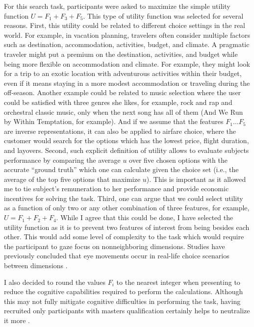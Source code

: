 \documentclass[a4paper,12pt]{article}
\begin{document}
For this search task, participants were asked to maximize the simple utility function $U = F_1 + F_3 + F_5$. This type of utility function was selected for several reasons. First, this utility could be related to different choice settings in the real world. For example, in vacation planning, travelers often consider multiple factors such as destination, accommodation, activities, budget, and climate. A pragmatic traveler might put a premium on the destination, activities, and budget while being more flexible on accommodation and climate. For example, they might look for a trip to an exotic location with adventurous activities within their budget, even if it means staying in a more modest accommodation or traveling during the off-season. Another example could be related to music selection where the user could be satisfied with three genres she likes, for example, rock and rap and orchestral classic music, only when the next song has all of them (And We Run by Within Temptation, for example). And if we assume that the features $F_1 \dots F_5$ are inverse representations, it can also be applied to airfare choice, where the customer would search for the options which has the lowest price, flight duration, and layovers.  Second, such explicit definition of utility allows to evaluate subjects performance by comparing the average $u$ over five chosen options with the accurate ``ground truth'' which one can calculate given the choice set (i.e., the average of the top five options that maximize $u$). This is important as it allowed me to tie subject's remuneration to her performance and provide economic incentives for solving the task. Third, one can argue that we could select utility as a function of only two or any other combination of three features, for example, $U = F_1 + F_2 + F_4$. While I agree that this could be done, I have selected the utility function as it is to prevent two features of interest from being besides each other. This would add some level of complexity to the task which would require the participant to gaze focus on nonneighboring dimensions. Studies have previously concluded that eye movements occur in real-life choice scenarios between dimensions \citep{noguchi2018multialternative}.

I also decided to round the values $F_i$ to the nearest integer when presenting to reduce the cognitive capabilities required to perform the calculations. Although this may not fully mitigate cognitive difficulties in performing the task, having recruited only participants with masters qualification certainly helps to neutralize it more \citep{aguinis2020mturk}.
\end{document}
